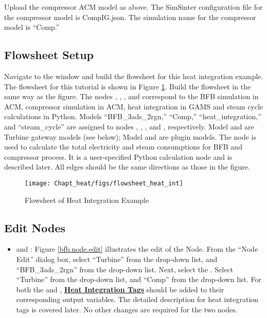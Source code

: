 Upload the compressor ACM model as above. The SimSinter configuration file for the compressor model is CompIG.json. The simulation name for the compressor model is ``Comp.''

\subsection{Flowsheet Setup}

Navigate to the  window and build the flowsheet for this heat integration example. The flowsheet for this tutorial is shown in Figure \ref{flowsheet.heat.int}. Build the flowsheet in the same way as the figure. The nodes , , , and  correspond to the BFB simulation in ACM, compressor simulation in ACM, heat integration in GAMS and steam cycle calculations in Python. Models ``BFB\_3ads\_2rgn,'' ``Comp,'' ``heat\_integration,'' and ``steam\_cycle'' are assigned to nodes , , , and , respectively. Model  and  are Turbine gateway models (see below); Model  and  are plugin models. The node  is used to calculate the total electricity and steam consumptions for BFB and compressor process. It is a user-specified Python calculation node and is described later. All edges should be the same directions as those in the figure.

\begin{figure}[H]
	\begin{center}
		\texttt{[image: Chapt\_heat/figs/flowsheet\_heat\_int]}
		\caption{Flowsheet of Heat Integration Example}
		\label{flowsheet.heat.int}
	\end{center}
\end{figure}

\subsection{Edit Nodes}

\begin{itemize}
	\item {} and : Figure \ref{bfb.node.edit} illustrates the edit of the  Node. From the ``Node Edit'' dialog box, select ``Turbine'' from the  drop-down list, and \\``BFB\_3ads\_2rgn'' from the  drop-down list.  Next, select the .  Select ``Turbine'' from the  drop-down list, and ``Comp'' from the  drop-down list. For both the  and , \textbf{\underline{Heat Integration Tags}} should be added to their corresponding output variables. The detailed description for heat integration tags is covered later. No other changes are required for the two nodes.
\end{itemize}


